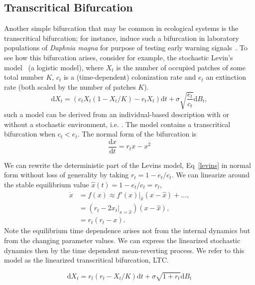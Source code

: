 \documentclass[authoryear, preprint,review,12pt]{elsarticle}
\newcommand{\ud}{\mathrm{d}}
\begin{document}
\subsection{Transcritical Bifurcation}
Another simple bifurcation that may be common in ecological systems is the transcritical bifurcation; for instance, \citet{Drake2010} induce such a bifurcation in laboratory populations of \emph{Daphnia magna} for purpose of testing early warning signals~\citep{Drake2010}.  To see how this bifurcation arises, consider for example, the stochastic Levin's model~\citep{Levins1969} (a logistic model), where $X_t$ is the number of occupied patches of some total number $K$, $c_t$ is a (time-dependent) colonization rate and $e_t$ an extinction rate (both scaled by the number of patches $K$).  
\begin{equation}
\ud X_t = \left( c_t X_t (1-X_t/K) - e_t X_t \right) \ud t + \sigma \sqrt{\frac{e_t}{c_t}} \ud B_t \label{levins},
\end{equation}
such a model can be derived from an individual-based description with or without a stochastic environment, i.e.  \citep{Kampen2007a, Nisbet2004a}.  The model contains a transcritical bifurcation when $c_t < e_t$.  The normal form of the bifurcation is
\begin{equation}
\frac{\ud x}{\ud t} = r_t x - x^2 
\label{transcritical}
\end{equation}

We can rewrite the deterministic part of the Levins model, Eq~\ref{levins} in normal form without loss of generality by taking $r_t = 1 - e_t/c_t$.  
We can linearize around the stable equilibrium value $\hat x(t) = 1 - e_t/c_t = r_t$, 
\begin{align}
\dot x &=  f(x) \approx f'(x)|_{\hat x} (x - \hat x) + \ldots, \nonumber \\
 &= (r_t - 2 x_t|_{x=\hat x}) (x - \hat x), \nonumber\\
 &= r_t(r_t - x). \nonumber
\end{align}
Note the equilibrium time dependence arises not from the internal dynamics but from the changing parameter values.  We can express the linearized stochastic dynamics then by the time dependent mean-reverting process.  We refer to this model as the linearized transcritical bifurcation, LTC.  

\begin{equation}
\ud X_t = r_t (r_t - X_t/K) \ud t + \sigma \sqrt{1+r_t} \ud B_t \label{LTC}
\end{equation}
\end{document}
